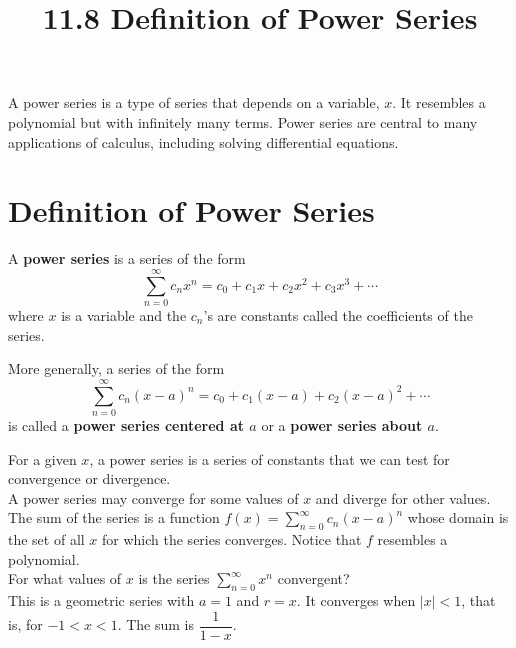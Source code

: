 \documentclass{article}
\title{11.8 Definition of Power Series}
\date{}
\author{}
\theoremstyle{mystyle}
\begin{document}
\maketitle

A power series is a type of series that depends on a variable, \(x\). It resembles a polynomial but with infinitely many terms. Power series are central to many applications of calculus, including solving differential equations.

\section*{Definition of Power Series}

\begin{tcolorbox}[
    colback=white,
    colframe=orange!80!white,
    title=Definition of a Power Series,
    boxrule=0.5mm,
    arc=3mm
    ]
    A \textbf{power series} is a series of the form
    \[ \sum_{n=0}^{\infty} c_n x^n = c_0 + c_1 x + c_2 x^2 + c_3 x^3 + \cdots \]
    where \(x\) is a variable and the \(c_n\)'s are constants called the coefficients of the series.
    
    More generally, a series of the form
    \[ \sum_{n=0}^{\infty} c_n (x-a)^n = c_0 + c_1 (x-a) + c_2 (x-a)^2 + \cdots \]
    is called a \textbf{power series centered at \(a\)} or a \textbf{power series about \(a\)}.
\end{tcolorbox}

For a given \(x\), a power series is a series of constants that we can test for convergence or divergence. \\
A power series may converge for some values of \(x\) and diverge for other values. 
\\The sum of the series is a function \( f(x) = \sum_{n=0}^\infty c_n (x-a)^n \) whose domain is the set of all \(x\) for which the series converges. Notice that \(f\) resembles a polynomial.\\
For what values of \(x\) is the series \( \sum_{n=0}^{\infty} x^n \) convergent?\\
This is a geometric series with \(a=1\) and \(r=x\). It converges when \(|x|<1\), that is, for \(-1 < x < 1\). The sum is \( \dfrac{1}{1-x} \).
\end{document}
